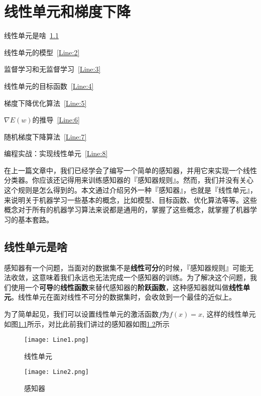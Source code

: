 \chapter{线性单元和梯度下降}\label{chap:Line}

\begin{introduction}
	\item 线性单元是啥~\ref{Line:1}
	\item 线性单元的模型~\ref{Line:2}
	\item 监督学习和无监督学习~\ref{Line:3}
	\item 线性单元的目标函数~\ref{Line:4}
	\item 梯度下降优化算法~\ref{Line:5}
	\item $\nabla{E}({w})$的推导~\ref{Line:6}
	\item 随机梯度下降算法~\ref{Line:7}
	\item 编程实战：实现线性单元~\ref{Line:8}
\end{introduction}


在上一篇文章中，我们已经学会了编写一个简单的感知器，并用它来实现一个线性分类器。你应该还记得用来训练感知器的『感知器规则』。然而，我们并没有关心这个规则是怎么得到的。本文通过介绍另外一种『感知器』，也就是『线性单元』，来说明关于机器学习一些基本的概念，比如模型、目标函数、优化算法等等。这些概念对于所有的机器学习算法来说都是通用的，掌握了这些概念，就掌握了机器学习的基本套路。

\section{线性单元是啥}\label{Line:1}
感知器有一个问题，当面对的数据集不是\textbf{线性可分}的时候，『感知器规则』可能无法收敛，这意味着我们永远也无法完成一个感知器的训练。为了解决这个问题，我们使用一个\textbf{可导}的\textbf{线性函数}来替代感知器的\textbf{阶跃函数}，这种感知器就叫做\textbf{线性单元}。线性单元在面对线性不可分的数据集时，会收敛到一个最佳的近似上。

为了简单起见，我们可以设置线性单元的激活函数$f$为$f(x)=x$, 这样的线性单元如图\ref{fig:Line1}所示，对比此前我们讲过的感知器如图\ref{fig:Line2}所示

\begin{figure}[h]
	\centering
	\texttt{[image: Line1.png]}
	\caption{线性单元}
	\label{fig:Line1}
\end{figure}

\begin{figure}[h]
	\centering
	\texttt{[image: Line2.png]}
	\caption{感知器}
	\label{fig:Line2}
\end{figure}


